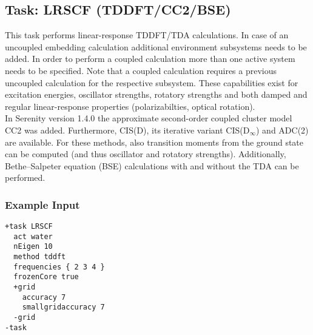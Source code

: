 \documentclass[bibliography=totocnumbered,a4paper,10pt,oneside]{scrbook}
\begin{document}
\clearpage
\subsection{Task: LRSCF (TDDFT/CC2/BSE)}
This task performs linear-response TDDFT/TDA calculations. In case of an uncoupled embedding calculation additional environment subsystems needs to be added. In order to perform a coupled calculation more than one active system needs to be specified. Note that a coupled calculation requires a previous uncoupled calculation for the respective subsystem. These capabilities exist for excitation energies, oscillator strengths, rotatory strengths and both damped and regular linear-response properties (polarizabilties, optical rotation).\\

\noindent
In Serenity version 1.4.0 the approximate second-order coupled cluster model CC2 was added. Furthermore, CIS(D), its iterative variant CIS(D$_\infty$) and
ADC(2) are available. For these methods, also transition moments from the ground state can be computed (and thus oscillator and rotatory strengths).
Additionally, Bethe--Salpeter equation (BSE) calculations with and without the TDA can be performed.

\subsubsection{Example Input}
\begin{lstlisting}
+task LRSCF
  act water
  nEigen 10
  method tddft
  frequencies { 2 3 4 }
  frozenCore true
  +grid
    accuracy 7
    smallgridaccuracy 7
  -grid
-task
\end{lstlisting}
\end{document}
